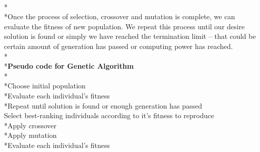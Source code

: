 \\*\\*Once the process of selection, crossover and mutation is complete, we can evaluate the fitness of new population. We repeat this process until our desire solution is found or simply we have reached the termination limit – that could be certain amount of generation has passed or computing power has reached. 
\\*\\*{\bf Pseudo code for Genetic Algorithm}
\\*\\*Choose initial population  
\\*Evaluate each individual's fitness
\\*Repeat until solution is found or enough generation has passed
\\\tab Select best-ranking individuals according to it’s fitness to reproduce  
	\\*\tab Apply crossover          
	\\*\tab Apply mutation       
	\\*\tab Evaluate each individual's fitness  